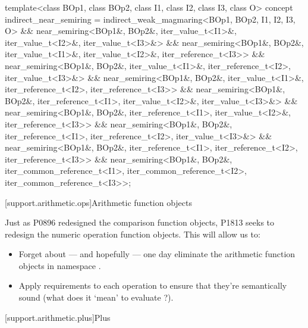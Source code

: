 \begin{itemdecl}
template<class BOp1, class BOp2, class I1, class I2, class I3, class O>
concept indirect_near_semiring =
  indirect_weak_magmaring<BOp1, BOp2, I1, I2, I3, O> &&
  near_semiring<BOp1&, BOp2&, iter_value_t<I1>&, iter_value_t<I2>&, iter_value_t<I3>&> &&
  near_semiring<BOp1&, BOp2&, iter_value_t<I1>&, iter_value_t<I2>&, iter_reference_t<I3>> &&
  near_semiring<BOp1&, BOp2&, iter_value_t<I1>&, iter_reference_t<I2>, iter_value_t<I3>&> &&
  near_semiring<BOp1&, BOp2&, iter_value_t<I1>&, iter_reference_t<I2>, iter_reference_t<I3>> &&
  near_semiring<BOp1&, BOp2&, iter_reference_t<I1>, iter_value_t<I2>&, iter_value_t<I3>&> &&
  near_semiring<BOp1&, BOp2&, iter_reference_t<I1>, iter_value_t<I2>&, iter_reference_t<I3>> &&
  near_semiring<BOp1&, BOp2&, iter_reference_t<I1>, iter_reference_t<I2>, iter_value_t<I3>&> &&
  near_semiring<BOp1&, BOp2&, iter_reference_t<I1>, iter_reference_t<I2>, iter_reference_t<I3>> &&
  near_semiring<BOp1&, BOp2&, iter_common_reference_t<I1>, iter_common_reference_t<I2>,
    iter_common_reference_t<I3>>;
\end{itemdecl}

[support.arithmetic.ops]{Arithmetic function objects}

Just as P0896 redesigned the comparison function objects, P1813 seeks to redesign the numeric
operation function objects. This will allow us to:

\begin{itemize}
   \item Forget about --- and hopefully --- one day eliminate the arithmetic function objects in
         namespace .
   \item Apply requirements to each operation to ensure that they're semantically sound (what does
         it `mean' to evaluate ?).
\end{itemize}

[support.arithmetic.plus]{Plus}

